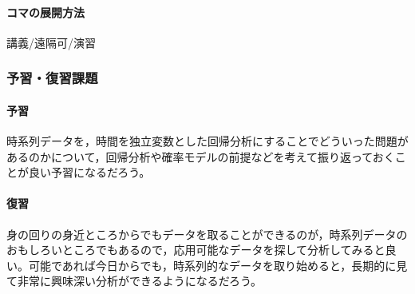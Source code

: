 \paragraph{コマの展開方法}
講義/遠隔可/演習
\subsubsection{予習・復習課題}
\paragraph{予習} 時系列データを，時間を独立変数とした回帰分析にすることでどういった問題があるのかについて，回帰分析や確率モデルの前提などを考えて振り返っておくことが良い予習になるだろう。
\paragraph{復習} 身の回りの身近ところからでもデータを取ることができるのが，時系列データのおもしろいところでもあるので，応用可能なデータを探して分析してみると良い。可能であれば今日からでも，時系列的なデータを取り始めると，長期的に見て非常に興味深い分析ができるようになるだろう。
